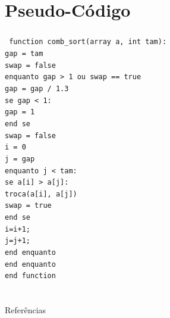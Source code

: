 \documentclass[aspectratio=169,table]{beamer}
\begin{document}
\section{Pseudo-Código}
	\begin{frame}
		\frametitle{\secname}
		\texttt{%
			\scriptsize
			function comb\_sort(array a, int tam):\\
			\qquad gap = tam\\
			\qquad swap = false\\
			\qquad enquanto gap > 1 ou swap == true\\
			\qquad \qquad gap = gap / 1.3\\
			\qquad \qquad se gap < 1:\\
			\qquad \qquad \qquad gap = 1\\
			\qquad \qquad end se\\
			\qquad \qquad swap = false\\
			\qquad \qquad i = 0\\
			\qquad \qquad j = gap\\
			\qquad \qquad enquanto j < tam:\\
			\qquad \qquad \qquad se a[i] > a[j]:\\
			\qquad \qquad \qquad \qquad troca(a[i], a[j])\\
			\qquad \qquad \qquad \qquad swap = true\\
			\qquad \qquad \qquad end se\\
			\qquad \qquad \qquad i=i+1;\\
			\qquad \qquad \qquad j=j+1;\\
			\qquad \qquad end enquanto\\
			\qquad end enquanto\\
			end function\\
		}
	\end{frame}

\section*{}

\begin{frame}{Referências}
	
\end{frame}

\end{document}
